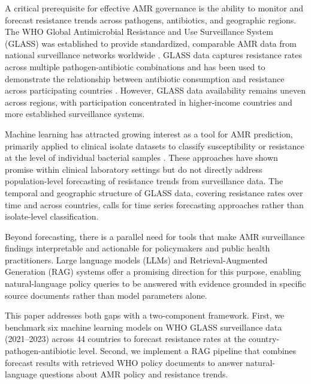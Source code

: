 \documentclass[12pt]{article}
\begin{document}
A critical prerequisite for effective AMR governance is the ability to monitor and forecast resistance trends across pathogens, antibiotics, and geographic regions. The WHO Global Antimicrobial Resistance and Use Surveillance System (GLASS) was established to provide standardized, comparable AMR data from national surveillance networks worldwide \citep{who2022glass, who2023manual}. GLASS data captures resistance rates across multiple pathogen-antibiotic combinations and has been used to demonstrate the relationship between antibiotic consumption and resistance across participating countries \citep{ajulo2024}. However, GLASS data availability remains uneven across regions, with participation concentrated in higher-income countries and more established surveillance systems.

Machine learning has attracted growing interest as a tool for AMR prediction, primarily applied to clinical isolate datasets to classify susceptibility or resistance at the level of individual bacterial samples \citep{sakagianni2023, kim2022}. These approaches have shown promise within clinical laboratory settings but do not directly address population-level forecasting of resistance trends from surveillance data. The temporal and geographic structure of GLASS data, covering resistance rates over time and across countries, calls for time series forecasting approaches rather than isolate-level classification.

Beyond forecasting, there is a parallel need for tools that make AMR surveillance findings interpretable and actionable for policymakers and public health practitioners. Large language models (LLMs) and Retrieval-Augmented Generation (RAG) systems \citep{lewis2020} offer a promising direction for this purpose, enabling natural-language policy queries to be answered with evidence grounded in specific source documents rather than model parameters alone.

This paper addresses both gaps with a two-component framework. First, we benchmark six machine learning models on WHO GLASS surveillance data (2021--2023) across 44 countries to forecast resistance rates at the country-pathogen-antibiotic level. Second, we implement a RAG pipeline that combines forecast results with retrieved WHO policy documents to answer natural-language questions about AMR policy and resistance trends.
\end{document}
